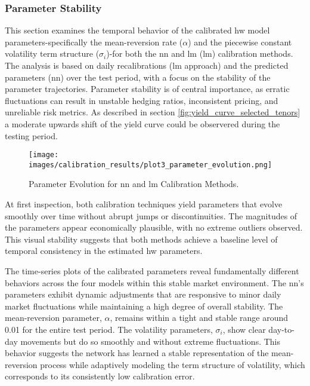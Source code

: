 \subsubsection{Parameter Stability}
This section examines the temporal behavior of the calibrated \ac{hw} model parameters-specifically the mean-reversion rate (\(\alpha\)) and the piecewise constant volatility term structure (\(\sigma_i\))-for both the \ac{nn} and \ac{lm} (\ac{lm}) calibration methods. The analysis is based on daily recalibrations (\ac{lm} approach) and the predicted parameters (\ac{nn}) over the test period, with a focus on the stability  of the parameter trajectories. Parameter stability is of central importance, as erratic fluctuations can result in unstable hedging ratios, inconsistent pricing, and unreliable risk metrics. As described in section \ref{fig:yield_curve_selected_tenors} a moderate upwards shift of the yield curve could be observered during the testing period.

\begin{figure}[H]
	\centering
	\texttt{[image: images/calibration\_results/plot3\_parameter\_evolution.png]}
	\caption{Parameter Evolution for \ac{nn} and \ac{lm} Calibration Methods.}
	\label{fig:parameter_evolution}
\end{figure}

At first inspection, both calibration techniques yield parameters that evolve smoothly over time without abrupt jumps or discontinuities. The magnitudes of the parameters appear economically plausible, with no extreme outliers observed. This visual stability suggests that both methods achieve a baseline level of temporal consistency in the estimated \ac{hw} parameters.

The time-series plots of the calibrated parameters reveal fundamentally different behaviors across the four models within this stable market environment. The \ac{nn}'s parameters exhibit dynamic adjustments that are responsive to minor daily market fluctuations while maintaining a high degree of overall stability. The mean-reversion parameter, $\alpha$, remains within a tight and stable range around 0.01 for the entire test period. The volatility parameters, $\sigma_i$, show clear day-to-day movements but do so smoothly and without extreme fluctuations. This behavior suggests the network has learned a stable representation of the mean-reversion process while adaptively modeling the term structure of volatility, which corresponds to its consistently low calibration error.

